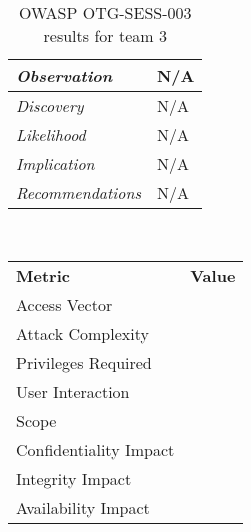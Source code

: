 \documentclass[headsepline,footsepline,footinclude=false,oneside,fontsize=11pt,paper=a4,listof=totoc,bibliography=totoc]{scrbook} %
\begin{document}
 \begin{table}[H]
 	\centering
 	\begin{tabular}{l p{11cm}}
 		\textit{Observation} &  N/A\\
 		\hline
 		\textit{Discovery} &  N/A \\
 		\hline
 		\textit{Likelihood} & N/A\\
 		\hline
 		\textit{Implication} & N/A\\
 		\hline
 		\textit{Recommendations} & N/A\\
 	\end{tabular}
 	\caption{OWASP OTG-SESS-003 results for team 3}
 	\label{table:scenario2}
 \end{table}
 \
 \vspace{0.5cm}
 \
 \begin{center}
 	\begin{tabular}{ll}
 		\rowcolor[HTML]{34CDF9}
 		{\color[HTML]{ECF4FF} \textbf{Metric}}        & {\color[HTML]{ECF4FF} \textbf{Value}} \\
 		\rowcolor[HTML]{BBDAFF}
 		{\color[HTML]{333333} Access Vector}          & {\color[HTML]{333333} }               \\
 		\rowcolor[HTML]{ECF4FF}
 		{\color[HTML]{333333} Attack Complexity}      & {\color[HTML]{333333} }               \\
 		\rowcolor[HTML]{BBDAFF}
 		{\color[HTML]{333333} Privileges Required}    & {\color[HTML]{333333} }               \\
 		\rowcolor[HTML]{ECF4FF}
 		{\color[HTML]{333333} User Interaction}       & {\color[HTML]{333333} }               \\
 		\rowcolor[HTML]{BBDAFF}
 		{\color[HTML]{333333} Scope}                  & {\color[HTML]{333333} }               \\
 		\rowcolor[HTML]{ECF4FF}
 		{\color[HTML]{333333} Confidentiality Impact} & {\color[HTML]{333333} }               \\
 		\rowcolor[HTML]{BBDAFF}
 		{\color[HTML]{333333} Integrity Impact}       & {\color[HTML]{333333} }               \\
 		\rowcolor[HTML]{ECF4FF}
 		{\color[HTML]{333333} Availability Impact}    & {\color[HTML]{333333} }
 	\end{tabular}
 \end{center}
\pagebreak
\end{document}
